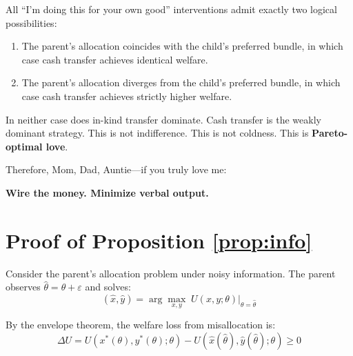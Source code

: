 \documentclass[AER]{AEA}
\DeclareRobustCommand{\AERlink}[1]{}
\begin{document}
All ``I'm doing this for your own good'' interventions admit exactly two logical possibilities:

\begin{enumerate}[label=(\roman*)]
\item The parent's allocation coincides with the child's preferred bundle, in which case cash transfer achieves identical welfare.
\item The parent's allocation diverges from the child's preferred bundle, in which case cash transfer achieves strictly higher welfare.
\end{enumerate}

In neither case does in-kind transfer dominate. Cash transfer is the weakly dominant strategy. This is not indifference. This is not coldness. This is \textbf{Pareto-optimal love}.

Therefore, Mom, Dad, Auntie---if you truly love me:

\begin{center}
\Large\textbf{Wire the money. Minimize verbal output.}
\end{center}

\FloatBarrier

\DeclareRobustCommand{\AERlink}[1]{\makebox[0pt][r]{\href{#1}{\color{blue}$\blacktriangleright$}\hspace{0.3em}}}

\nocite{*}



\appendix
\section{Proof of Proposition \ref{prop:info}}

Consider the parent's allocation problem under noisy information. The parent observes $\hat{\theta} = \theta + \varepsilon$ and solves:
\begin{equation}
(\hat{x}, \hat{y}) = \arg\max_{x,y} \; U(x,y;\theta) \Big|_{\theta = \hat{\theta}}
\end{equation}

By the envelope theorem, the welfare loss from misallocation is:
\begin{equation}
\Delta U = U(x^*(\theta), y^*(\theta); \theta) - U(\hat{x}(\hat{\theta}), \hat{y}(\hat{\theta}); \theta) \geq 0
\end{equation}
\end{document}

